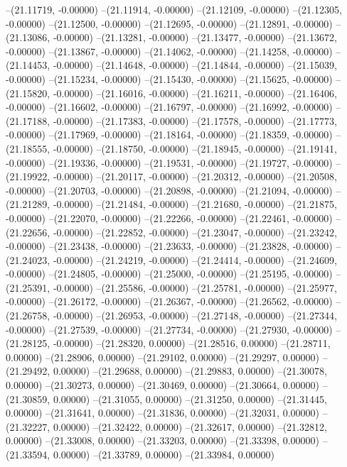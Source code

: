 --(21.11719, -0.00000)
--(21.11914, -0.00000)
--(21.12109, -0.00000)
--(21.12305, -0.00000)
--(21.12500, -0.00000)
--(21.12695, -0.00000)
--(21.12891, -0.00000)
--(21.13086, -0.00000)
--(21.13281, -0.00000)
--(21.13477, -0.00000)
--(21.13672, -0.00000)
--(21.13867, -0.00000)
--(21.14062, -0.00000)
--(21.14258, -0.00000)
--(21.14453, -0.00000)
--(21.14648, -0.00000)
--(21.14844, -0.00000)
--(21.15039, -0.00000)
--(21.15234, -0.00000)
--(21.15430, -0.00000)
--(21.15625, -0.00000)
--(21.15820, -0.00000)
--(21.16016, -0.00000)
--(21.16211, -0.00000)
--(21.16406, -0.00000)
--(21.16602, -0.00000)
--(21.16797, -0.00000)
--(21.16992, -0.00000)
--(21.17188, -0.00000)
--(21.17383, -0.00000)
--(21.17578, -0.00000)
--(21.17773, -0.00000)
--(21.17969, -0.00000)
--(21.18164, -0.00000)
--(21.18359, -0.00000)
--(21.18555, -0.00000)
--(21.18750, -0.00000)
--(21.18945, -0.00000)
--(21.19141, -0.00000)
--(21.19336, -0.00000)
--(21.19531, -0.00000)
--(21.19727, -0.00000)
--(21.19922, -0.00000)
--(21.20117, -0.00000)
--(21.20312, -0.00000)
--(21.20508, -0.00000)
--(21.20703, -0.00000)
--(21.20898, -0.00000)
--(21.21094, -0.00000)
--(21.21289, -0.00000)
--(21.21484, -0.00000)
--(21.21680, -0.00000)
--(21.21875, -0.00000)
--(21.22070, -0.00000)
--(21.22266, -0.00000)
--(21.22461, -0.00000)
--(21.22656, -0.00000)
--(21.22852, -0.00000)
--(21.23047, -0.00000)
--(21.23242, -0.00000)
--(21.23438, -0.00000)
--(21.23633, -0.00000)
--(21.23828, -0.00000)
--(21.24023, -0.00000)
--(21.24219, -0.00000)
--(21.24414, -0.00000)
--(21.24609, -0.00000)
--(21.24805, -0.00000)
--(21.25000, -0.00000)
--(21.25195, -0.00000)
--(21.25391, -0.00000)
--(21.25586, -0.00000)
--(21.25781, -0.00000)
--(21.25977, -0.00000)
--(21.26172, -0.00000)
--(21.26367, -0.00000)
--(21.26562, -0.00000)
--(21.26758, -0.00000)
--(21.26953, -0.00000)
--(21.27148, -0.00000)
--(21.27344, -0.00000)
--(21.27539, -0.00000)
--(21.27734, -0.00000)
--(21.27930, -0.00000)
--(21.28125, -0.00000)
--(21.28320, 0.00000)
--(21.28516, 0.00000)
--(21.28711, 0.00000)
--(21.28906, 0.00000)
--(21.29102, 0.00000)
--(21.29297, 0.00000)
--(21.29492, 0.00000)
--(21.29688, 0.00000)
--(21.29883, 0.00000)
--(21.30078, 0.00000)
--(21.30273, 0.00000)
--(21.30469, 0.00000)
--(21.30664, 0.00000)
--(21.30859, 0.00000)
--(21.31055, 0.00000)
--(21.31250, 0.00000)
--(21.31445, 0.00000)
--(21.31641, 0.00000)
--(21.31836, 0.00000)
--(21.32031, 0.00000)
--(21.32227, 0.00000)
--(21.32422, 0.00000)
--(21.32617, 0.00000)
--(21.32812, 0.00000)
--(21.33008, 0.00000)
--(21.33203, 0.00000)
--(21.33398, 0.00000)
--(21.33594, 0.00000)
--(21.33789, 0.00000)
--(21.33984, 0.00000)
